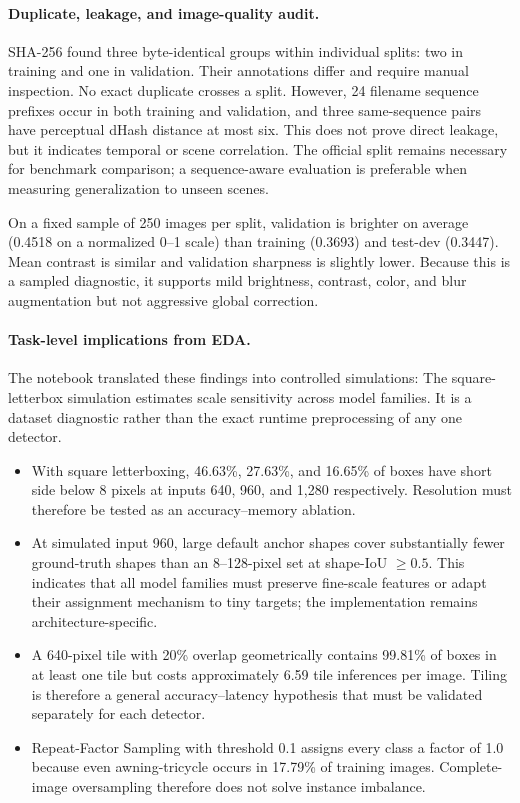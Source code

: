 \paragraph{Duplicate, leakage, and image-quality audit.}
SHA-256 found three byte-identical groups within individual splits: two in
training and one in validation. Their annotations differ and require manual
inspection. No exact duplicate crosses a split. However, 24 filename sequence
prefixes occur in both training and validation, and three same-sequence pairs
have perceptual dHash distance at most six. This does not prove direct leakage,
but it indicates temporal or scene correlation. The official split remains
necessary for benchmark comparison; a sequence-aware evaluation is preferable
when measuring generalization to unseen scenes.

On a fixed sample of 250 images per split, validation is brighter on average
(0.4518 on a normalized 0--1 scale) than training (0.3693) and test-dev
(0.3447). Mean contrast is similar and validation sharpness is slightly lower.
Because this is a sampled diagnostic, it supports mild brightness, contrast,
color, and blur augmentation but not aggressive global correction.

\paragraph{Task-level implications from EDA.}
The notebook translated these findings into controlled simulations:
The square-letterbox simulation estimates scale sensitivity across model
families. It is a dataset diagnostic rather than the exact runtime preprocessing
of any one detector.
\begin{itemize}
  \item With square letterboxing, 46.63\%, 27.63\%, and 16.65\% of boxes have
  short side below 8 pixels at inputs 640, 960, and 1,280 respectively.
  Resolution must therefore be tested as an accuracy--memory ablation.
  \item At simulated input 960, large default anchor shapes cover substantially
  fewer ground-truth shapes than an 8--128-pixel set at shape-IoU $\geq0.5$.
  This indicates that all model families must preserve fine-scale features or
  adapt their assignment mechanism to tiny targets; the implementation remains
  architecture-specific.
  \item A 640-pixel tile with 20\% overlap geometrically contains 99.81\% of
  boxes in at least one tile but costs approximately 6.59 tile inferences per
  image. Tiling is therefore a general accuracy--latency hypothesis that must
  be validated separately for each detector.
  \item Repeat-Factor Sampling with threshold 0.1 assigns every class a factor
  of 1.0 because even awning-tricycle occurs in 17.79\% of training images.
  Complete-image oversampling therefore does not solve instance imbalance.
\end{itemize}

